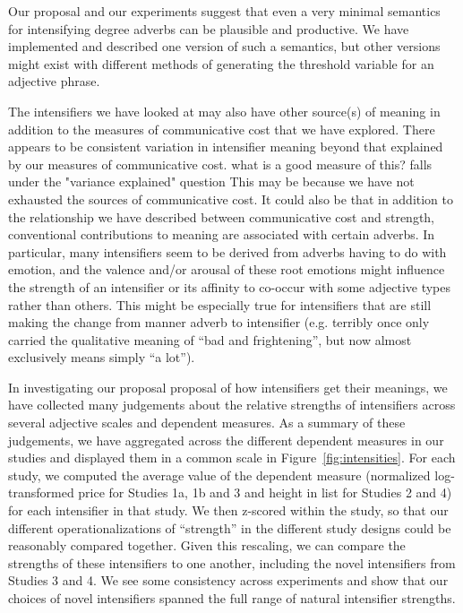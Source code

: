 \documentclass[10pt,letterpaper]{article}
\newcommand{\todo}[1]{{\color{red}#1}}
\newcommand{\ndg}[1]{{\color{green}#1}}
\begin{document}
Our proposal and our experiments suggest that even a very minimal semantics for intensifying degree adverbs can be plausible and productive.
We have implemented and described one version of such a semantics, but other versions might exist with different methods of generating the threshold variable for an adjective phrase.

The intensifiers we have looked at may also have other source(s) of meaning in addition to the measures of communicative cost that we have explored.
There appears to be consistent variation in intensifier meaning beyond that explained by our measures of communicative cost.
\todo{what is a good measure of this? falls under the "variance explained" question}
This may be because we have not exhausted the sources of communicative cost.
It could also be that in addition to the relationship we have described between communicative cost and strength, conventional contributions to meaning are associated with certain adverbs.
 In particular, many intensifiers seem to be derived from adverbs having to do with emotion, and the valence and/or arousal of these root emotions might influence the strength of an intensifier or its affinity to co-occur with some adjective types rather than others.
This might be especially true for intensifiers that are still making the change from manner adverb to intensifier (e.g. terribly once only carried the qualitative meaning of ``bad and frightening'', but now almost exclusively means simply ``a lot'').


In investigating our proposal proposal of how intensifiers get their meanings, we have collected many judgements about the relative strengths of intensifiers across several adjective scales and dependent measures.
As a summary of these judgements, we have aggregated across the different dependent measures in our studies and displayed them in a common scale in Figure~\ref{fig:intensities}.
For each study, we computed the average value of the dependent measure (normalized log-transformed price for Studies 1a, 1b and 3 and height in list for Studies 2 and 4) for each intensifier in that study. We then z-scored within the study, so that our different operationalizations of ``strength'' in the different study designs could be reasonably compared together.
Given this rescaling, we can compare the strengths of these intensifiers to one another, including the novel intensifiers from Studies 3 and 4.
We see some consistency across experiments and show that our choices of novel intensifiers spanned the full range of natural intensifier strengths.
\end{document}
